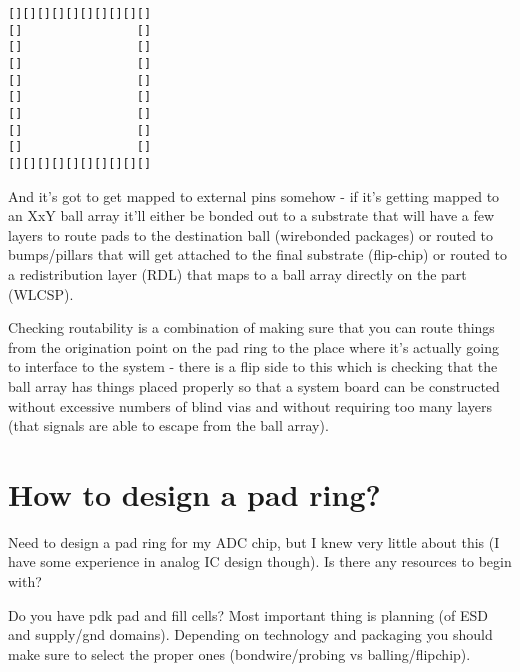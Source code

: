 \documentclass{article}
\begin{document}
\begin{verbatim}
[][][][][][][][][][]
[]                []
[]                []
[]                []
[]                []
[]                []
[]                []
[]                []
[]                []
[][][][][][][][][][]
\end{verbatim}

\begin{info}
	
	And it's got to get mapped to external pins somehow - if it's getting mapped to an XxY ball array it'll either be bonded out to a substrate that will have a few layers to route pads to the destination ball (wirebonded packages) or routed to bumps/pillars that will get attached to the final substrate (flip-chip) or routed to a redistribution layer (RDL) that maps to a ball array directly on the part (WLCSP).

	Checking routability is a combination of making sure that you can route things from the origination point on the pad ring to the place where it's actually going to interface to the system - there is a flip side to this which is checking that the ball array has things placed properly so that a system board can be constructed without excessive numbers of blind vias and without requiring too many layers (that signals are able to escape from the ball array).

\end{info}


\section{How to design a pad ring?}

Need to design a pad ring for my ADC chip, but I knew very little about this (I have some experience in analog IC design though). Is there any resources to begin with?

\begin{info}
	
	Do you have pdk pad and fill cells? Most important thing is planning (of ESD and supply/gnd domains). Depending on technology and packaging you should make sure to select the proper ones (bondwire/probing vs balling/flipchip).

\end{info}
\end{document}

